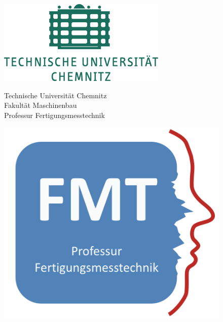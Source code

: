 \begin{titlepage}
	
\begin{figure}[htbp]
	\begin{minipage}{0.19\textwidth}
		\includegraphics[width=\textwidth]{img/logo_tuc.pdf}
	\end{minipage}
	\hfill
	\begin{minipage}{0.6\textwidth} 
		\begin{center}	
			Technische Universität Chemnitz\\
			Fakultät Maschinenbau\\
			Professur Fertigungsmesstechnik
		\end{center}
	\end{minipage}
	\hfill
	\begin{minipage}{0.19\textwidth} 
		\includegraphics[width=\textwidth]{img/logo_fmt.png}
	\end{minipage}
\end{figure}
	

\end{titlepage}
